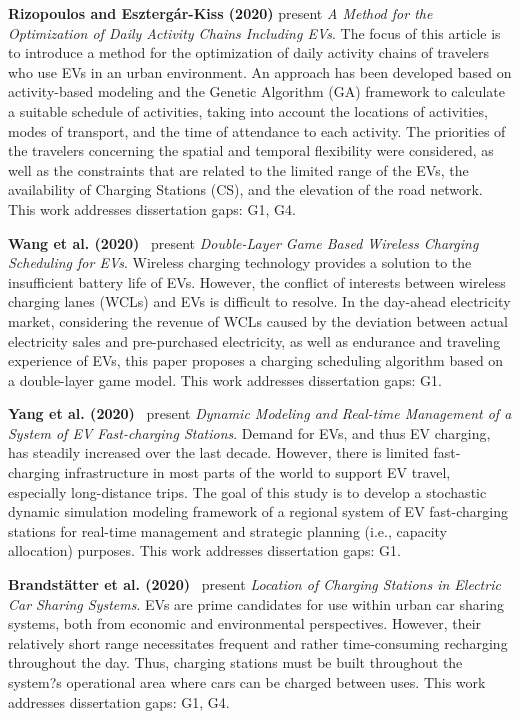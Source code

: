 \documentclass[letterpaper, 12pt, oneside, doublespacing]{Thesis}
\begin{document}
\noindent \textbf{Rizopoulos and Eszterg\'ar-Kiss (2020)} present \textit{A Method for the Optimization of Daily Activity Chains Including EVs}. The focus of this article is to introduce a method for the optimization of daily activity chains of travelers who use EVs in an urban environment. An approach has been developed based on activity-based modeling and the Genetic Algorithm (GA) framework to calculate a suitable schedule of activities, taking into account the locations of activities, modes of transport, and the time of attendance to each activity. The priorities of the travelers concerning the spatial and temporal flexibility were considered, as well as the constraints that are related to the limited range of the EVs, the availability of Charging Stations (CS), and the elevation of the road network. This work addresses dissertation gaps: G1, G4.



\noindent \textbf{Wang et al. (2020)}~\cite{double-layer_game_2020} present \textit{Double-Layer Game Based Wireless Charging Scheduling for EVs}. Wireless charging technology provides a solution to the insufficient battery life of EVs. However, the conflict of interests between wireless charging lanes (WCLs) and EVs is difficult to resolve. In the day-ahead electricity market, considering the revenue of WCLs caused by the deviation between actual electricity sales and pre-purchased electricity, as well as endurance and traveling experience of EVs, this paper proposes a charging scheduling algorithm based on a double-layer game model. This work addresses dissertation gaps: G1.



\noindent \textbf{Yang et al. (2020)}~\cite{dynamic_modeling_2020} present \textit{Dynamic Modeling and Real-time Management of a System of EV Fast-charging Stations}. Demand for EVs, and thus EV charging, has steadily increased over the last decade. However, there is limited fast-charging infrastructure in most parts of the world to support EV travel, especially long-distance trips. The goal of this study is to develop a stochastic dynamic simulation modeling framework of a regional system of EV fast-charging stations for real-time management and strategic planning (i.e., capacity allocation) purposes. This work addresses dissertation gaps: G1.



\noindent \textbf{Brandst\"atter et al. (2020)}~\cite{location_of_2020} present \textit{Location of Charging Stations in Electric Car Sharing Systems}. EVs are prime candidates for use within urban car sharing systems, both from economic and environmental perspectives. However, their relatively short range necessitates frequent and rather time-consuming recharging throughout the day. Thus, charging stations must be built throughout the system?s operational area where cars can be charged between uses. This work addresses dissertation gaps: G1, G4.
\end{document}
